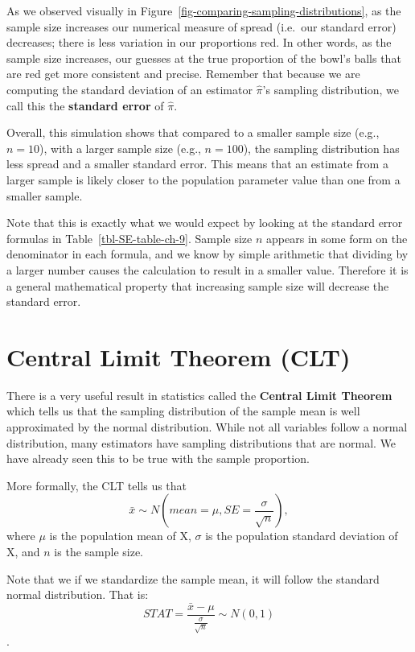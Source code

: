 \documentclass[
  letterpaper,
  DIV=11,
  numbers=noendperiod]{scrreprt}
\theoremstyle{definition}
\theoremstyle{remark}
\begin{document}
As we observed visually in
Figure~\ref{fig-comparing-sampling-distributions}, as the sample size
increases our numerical measure of spread (i.e.~our standard error)
decreases; there is less variation in our proportions red. In other
words, as the sample size increases, our guesses at the true proportion
of the bowl's balls that are red get more consistent and precise.
Remember that because we are computing the standard deviation of an
estimator \(\hat{\pi}\)'s sampling distribution, we call this the
\textbf{standard error} of \(\hat{\pi}\).

Overall, this simulation shows that compared to a smaller sample size
(e.g., \(n = 10\)), with a larger sample size (e.g., \(n = 100\)), the
sampling distribution has less spread and a smaller standard error. This
means that an estimate from a larger sample is likely closer to the
population parameter value than one from a smaller sample.

Note that this is exactly what we would expect by looking at the
standard error formulas in Table~\ref{tbl-SE-table-ch-9}. Sample size
\(n\) appears in some form on the denominator in each formula, and we
know by simple arithmetic that dividing by a larger number causes the
calculation to result in a smaller value. Therefore it is a general
mathematical property that increasing sample size will decrease the
standard error.

\hypertarget{sec-clt}{%
\section{Central Limit Theorem (CLT)}\label{sec-clt}}

There is a very useful result in statistics called the \textbf{Central
Limit Theorem} which tells us that the sampling distribution of the
sample mean is well approximated by the normal distribution. While not
all variables follow a normal distribution, many estimators have
sampling distributions that are normal. We have already seen this to be
true with the sample proportion.

More formally, the CLT tells us that
\[\bar{x} \sim N(mean = \mu, SE = \frac{\sigma}{\sqrt{n}}),\] where
\(\mu\) is the population mean of X, \(\sigma\) is the population
standard deviation of X, and \(n\) is the sample size.

Note that we if we standardize the sample mean, it will follow the
standard normal distribution. That is:
\[STAT = \frac{\bar{x} - \mu}{\frac{\sigma}{\sqrt{n}}} \sim N(0,1)\].
\end{document}
